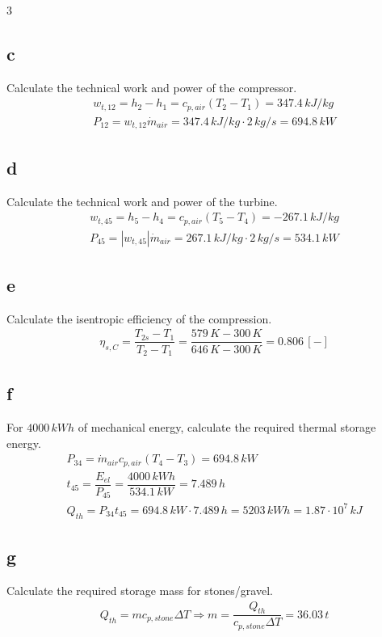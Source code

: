 \documentclass[9pt, landscape, a4paper]{article}
\begin{document}
\begin{multicols*}{3}
\subsection*{c}
Calculate the technical work and power of the compressor.
\begingroup
\scriptsize
\begin{align*}
  & w_{t,12}=h_2-h_1=c_{p,air}\left(T_2-T_1\right)=347.4\,kJ/kg\\[.8ex]
  & P_{12}=w_{t,12}\dot m_{air}=347.4\,kJ/kg\cdot2\,kg/s=694.8\,kW
\end{align*}
\endgroup

\subsection*{d}
Calculate the technical work and power of the turbine.
\begingroup
\scriptsize
\begin{align*}
  & w_{t,45}=h_5-h_4=c_{p,air}\left(T_5-T_4\right)=-267.1\,kJ/kg\\[.8ex]
  & P_{45}=\left|w_{t,45}\right|\dot m_{air}
  =267.1\,kJ/kg\cdot2\,kg/s=534.1\,kW
\end{align*}
\endgroup

\subsection*{e}
Calculate the isentropic efficiency of the compression.
\begingroup
\scriptsize
\begin{align*}
  & \eta_{s,C}=\dfrac{T_{2s}-T_1}{T_2-T_1}
  =\dfrac{579\,K-300\,K}{646\,K-300\,K}=0.806\,[-]
\end{align*}
\endgroup

\subsection*{f}
For $4000\,kWh$ of mechanical energy, calculate the required thermal storage
energy.
\begingroup
\scriptsize
\begin{align*}
  & P_{34}=\dot m_{air}c_{p,air}\left(T_4-T_3\right)=694.8\,kW\\[.8ex]
  & t_{45}=\dfrac{E_{el}}{P_{45}}=\dfrac{4000\,kWh}{534.1\,kW}=7.489\,h\\[.8ex]
  & Q_{th}=P_{34}t_{45}=694.8\,kW\cdot7.489\,h
  =5203\,kWh=1.87\cdot10^7\,kJ
\end{align*}
\endgroup

\subsection*{g}
Calculate the required storage mass for stones/gravel.
\begingroup
\scriptsize
\begin{align*}
  & Q_{th}=mc_{p,stone}\Delta T
  \Longrightarrow
  m=\dfrac{Q_{th}}{c_{p,stone}\Delta T}=36.03\,t
\end{align*}
\endgroup


\end{multicols*}
\end{document}
